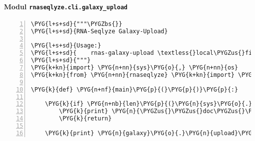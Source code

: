 \paragraph{Modul \texttt{rnaseqlyze.cli.galaxy\_upload}}
\label{rnaseqlyze-pdf:modul-rnaseqlyze-cli-galaxy-upload}
\begin{Verbatim}[commandchars=\\\{\},numbers=left,firstnumber=1,stepnumber=5]
\PYG{l+s+sd}{"""\PYGZbs{}}
\PYG{l+s+sd}{RNA-Seqlyze Galaxy-Upload}

\PYG{l+s+sd}{Usage:}
\PYG{l+s+sd}{    rnas-galaxy-upload \textless{}local\PYGZus{}file\textgreater{}}
\PYG{l+s+sd}{"""}
\PYG{k+kn}{import} \PYG{n+nn}{sys}\PYG{o}{,} \PYG{n+nn}{os}
\PYG{k+kn}{from} \PYG{n+nn}{rnaseqlyze} \PYG{k+kn}{import} \PYG{n}{galaxy}

\PYG{k}{def} \PYG{n+nf}{main}\PYG{p}{(}\PYG{p}{)}\PYG{p}{:}

    \PYG{k}{if} \PYG{n+nb}{len}\PYG{p}{(}\PYG{n}{sys}\PYG{o}{.}\PYG{n}{argv}\PYG{p}{)} \PYG{o}{\textless{}} \PYG{l+m+mi}{2} \PYG{o+ow}{or} \PYG{n}{sys}\PYG{o}{.}\PYG{n}{argv}\PYG{p}{[}\PYG{l+m+mi}{1}\PYG{p}{]} \PYG{o+ow}{in} \PYG{p}{(}\PYG{l+s}{'}\PYG{l+s}{-h}\PYG{l+s}{'}\PYG{p}{,} \PYG{l+s}{'}\PYG{l+s}{--help}\PYG{l+s}{'}\PYG{p}{)}\PYG{p}{:}
        \PYG{k}{print} \PYG{n}{\PYGZus{}\PYGZus{}doc\PYGZus{}\PYGZus{}}
        \PYG{k}{return}

    \PYG{k}{print} \PYG{n}{galaxy}\PYG{o}{.}\PYG{n}{upload}\PYG{p}{(}\PYG{n+nb}{open}\PYG{p}{(}\PYG{n}{sys}\PYG{o}{.}\PYG{n}{argv}\PYG{p}{[}\PYG{l+m+mi}{1}\PYG{p}{]}\PYG{p}{)}\PYG{p}{,} \PYG{n}{os}\PYG{o}{.}\PYG{n}{path}\PYG{o}{.}\PYG{n}{basename}\PYG{p}{(}\PYG{n}{sys}\PYG{o}{.}\PYG{n}{argv}\PYG{p}{[}\PYG{l+m+mi}{1}\PYG{p}{]}\PYG{p}{)}\PYG{p}{)}
\end{Verbatim}


